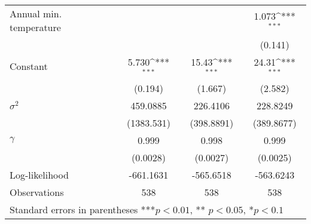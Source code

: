\documentclass{beamer}
\def\sym#1{\ifmmode^{#1}\else\(^{#1}\)\fi}
\begin{document}
\begin{frame}[shrink=40]
\begin{table}
\begin{tabular}{l c c c}
Annual min. temperature       &                     &                     &       1.073\sym{***}\\
                    &                     &                     &     (0.141)         \\

Constant            &       5.730\sym{***}&       15.43\sym{***}&       24.31\sym{***}\\
                    &     (0.194)         &     (1.667)         &     (2.582)         \\

$\sigma^2$                &        459.0885             &       226.4106               &         228.8249             \\

                    & (1383.531)          &   (398.8891)    &       (389.8677)       \\

$\gamma$              &       0.999               &       0.998          &          0.999               \\

                    &  (0.0028)        &    (0.0027)       &    (0.0025)        \\

Log-likelihood&-661.1631 &-565.6518 &-563.6243 \\
Observations        &         538         &         538         &         538         \\
\bottomrule
 \multicolumn{4}{l}{\footnotesize Standard errors in parentheses ***\(p<0.01\), ** \(p<0.05\), *\(p<0.1\)}\\
\end{tabular}
\end{table}

\end{frame} 
\end{document}

